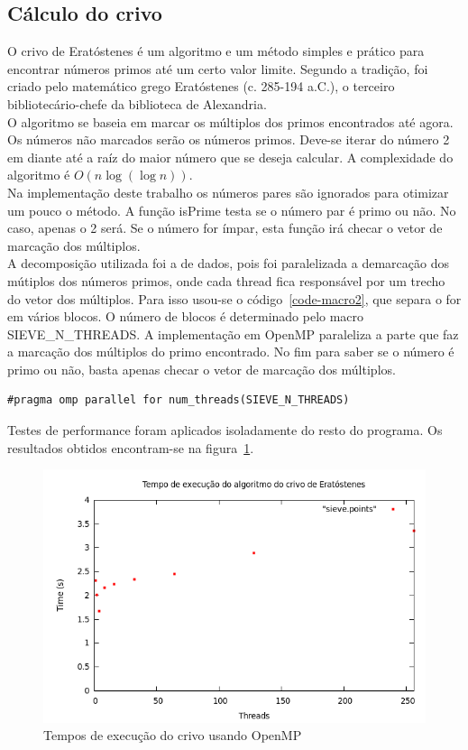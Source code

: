 \documentclass[a4paper]{article}
\begin{document}
\subsection{Cálculo do crivo}
\indent \indent O crivo de Eratóstenes é um algoritmo e um método simples e prático para encontrar números primos até um certo valor limite. Segundo a tradição, foi criado pelo matemático grego Eratóstenes (c. 285-194 a.C.), o terceiro bibliotecário-chefe da biblioteca de Alexandria.\\
\indent O algoritmo se baseia em marcar os múltiplos dos primos encontrados até agora. Os números não marcados serão os números primos. Deve-se iterar do número 2 em diante até a raíz do maior número que se deseja calcular. A complexidade do algoritmo é \begin{math}O(n\log(\log n))\end{math}.\\
\indent Na implementação deste trabalho os números pares são ignorados para otimizar um pouco o método. A função isPrime testa se o número par é primo ou não. No caso, apenas o 2 será. Se o número for ímpar, esta função irá checar o vetor de marcação dos múltiplos.\\
\indent A decomposição utilizada foi a de dados, pois foi paralelizada a demarcação dos mútiplos dos números primos, onde cada thread fica responsável por um trecho do vetor dos múltiplos. Para isso usou-se o código~\ref{code-macro2}, que separa o for em vários blocos. O número de blocos é determinado pelo macro SIEVE\_N\_THREADS. A implementação em OpenMP paraleliza a parte que faz a marcação dos múltiplos do primo encontrado. No fim para saber se o número é primo ou não, basta apenas checar o vetor de marcação dos múltiplos.
\begin{lstlisting}[caption=Macro que paraleliza o algoritmo do palíndromo, label=code-macro2]
#pragma omp parallel for num_threads(SIEVE_N_THREADS)
\end{lstlisting}
\indent \indent Testes de performance foram aplicados isoladamente do resto do programa. Os resultados obtidos encontram-se na figura~\ref{graph-sieve-openmp}.
\begin{figure}[float=p]
	\includegraphics[scale=0.5]{graph-sieve-openmp}
	\caption{Tempos de execução do crivo usando OpenMP}
	\label{graph-sieve-openmp}
\end{figure}
\end{document}

